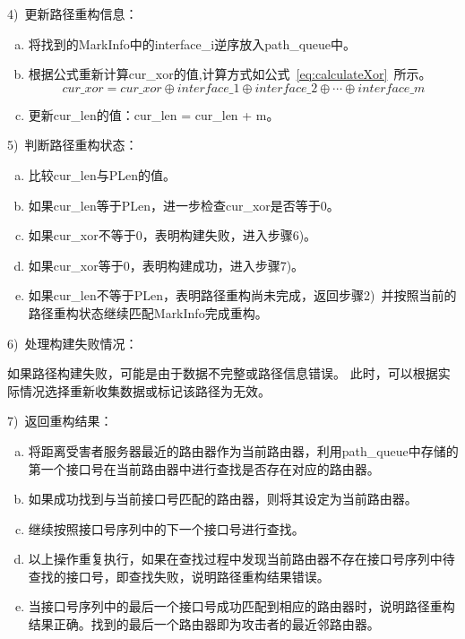 4)~更新路径重构信息：\par
\begin{enumerate}[a.]
	\item 将找到的MarkInfo中的interface\_i逆序放入path\_queue中。
	\item 根据公式重新计算cur\_xor的值,计算方式如公式~\ref{eq:calculateXor}~所示。
	      \begin{equation}
		      \label{eq:calculateXor}
		      cur\_xor = cur\_xor \oplus interface\_1 \oplus interface\_2 \oplus \cdots \oplus interface\_m
	      \end{equation}
	\item 更新cur\_len的值：cur\_len = cur\_len + m。
\end{enumerate}

5)~判断路径重构状态：\par
\begin{enumerate}[a.]
	\item 比较cur\_len与PLen的值。
	\item 如果cur\_len等于PLen，进一步检查cur\_xor是否等于0。
	\item 如果cur\_xor不等于0，表明构建失败，进入步骤6)。
	\item 如果cur\_xor等于0，表明构建成功，进入步骤7)。
	\item 如果cur\_len不等于PLen，表明路径重构尚未完成，返回步骤2)~并按照当前的路径重构状态继续匹配MarkInfo完成重构。
\end{enumerate}


6)~处理构建失败情况：\par
如果路径构建失败，可能是由于数据不完整或路径信息错误。
此时，可以根据实际情况选择重新收集数据或标记该路径为无效。\par

7)~返回重构结果：\par
\begin{enumerate}[a.]
	\item 将距离受害者服务器最近的路由器作为当前路由器，利用path\_queue中存储的第一个接口号在当前路由器中进行查找是否存在对应的路由器。
	\item 如果成功找到与当前接口号匹配的路由器，则将其设定为当前路由器。
	\item 继续按照接口号序列中的下一个接口号进行查找。
	\item 以上操作重复执行，如果在查找过程中发现当前路由器不存在接口号序列中待查找的接口号，即查找失败，说明路径重构结果错误。
	\item 当接口号序列中的最后一个接口号成功匹配到相应的路由器时，说明路径重构结果正确。找到的最后一个路由器即为攻击者的最近邻路由器。
\end{enumerate}

